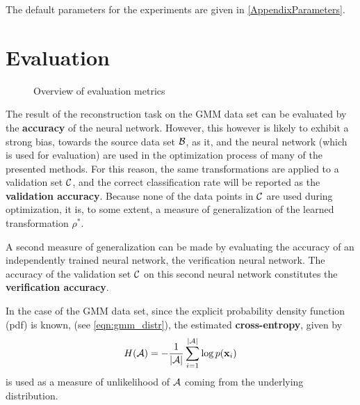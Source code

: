 The default parameters for the experiments are given in \cref{AppendixParameters}.




\section{Evaluation}
\label{sec:evaluation}

\begin{figure}[ht]
    \centering
    
    \caption{Overview of evaluation metrics}
    \label{fig:evaluation_overview}
    \centering
\end{figure}

The result of the reconstruction task on the GMM data set can be evaluated by the \textbf{accuracy}
of the neural network. However, this however is likely to exhibit a strong bias,
towards the source data set $\mathcal B$, 
as it, and the neural network (which is used for evaluation)
are used in the optimization process
of many of the presented methods.
For this reason, the same transformations are applied to
a validation set $\mathcal C$, and the 
correct classification rate will be reported as the \textbf{validation accuracy}. 
Because none of the data points in $\mathcal C$
are used during optimization, it is, to some extent, a measure of generalization
of the learned transformation $\rho^*$.

A second measure of generalization can be made by evaluating the accuracy of an
independently trained neural network, the verification neural network.
The accuracy of the validation set $\mathcal C$ on this second neural network 
constitutes the \textbf{verification accuracy}.

In the case of the GMM data set, since the explicit probability density function (pdf) is known, 
(see \ref{eqn:gmm_distr}), the estimated \textbf{cross-entropy}, given by
\begin{equation}
\label{eqn:cross_entropy}
    H(\mathcal A) = - \frac 1 {|\mathcal A|} \sum_{i=1}^{|\mathcal A|} \log p(\mathbf x_i)
\end{equation}
is used as a measure of unlikelihood of $\mathcal A$ coming from the underlying distribution.


